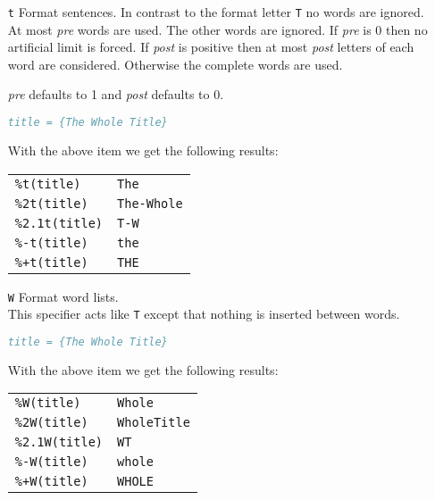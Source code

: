 \documentclass[11pt,a4paper]{scrbook}
\begin{document}
\begin{itemize}
  \item [\texttt{t}] Format sentences. In contrast to the
    format letter \texttt{T} no words are ignored.\\
    At most \textit{pre} words are used. The other words are ignored. If
    \textit{pre} is 0 then no artificial limit is forced. If \textit{post} is
    positive then at most \textit{post} letters of each word are considered.
    Otherwise the complete words are used.

    \textit{pre} defaults to 1 and \textit{post} defaults to 0.

    \begin{Example}
      \begin{lstlisting}[language=BibTeX]
  title = {The Whole Title}
      \end{lstlisting}\vspace{-2ex}
      With the above item we get the following results:

      \begin{tabular}{ll}
        \texttt{\%t(title)}	& \texttt{The}		\\
        \texttt{\%2t(title)}	& \texttt{The-Whole}	\\
        \texttt{\%2.1t(title)}	& \texttt{T-W}		\\
        \texttt{\%-t(title)}	& \texttt{the}		\\
        \texttt{\%+t(title)}	& \texttt{THE}
      \end{tabular}
    \end{Example}

  \item [\texttt{W}] Format word lists.\\
    This specifier acts like \texttt{T} except that nothing is inserted
    between words.

    \begin{Example}
      \begin{lstlisting}[language=BibTeX]
  title = {The Whole Title}
      \end{lstlisting}\vspace{-2ex}
      With the above item we get the following results:

      \begin{tabular}{ll}
        \texttt{\%W(title)}	& \texttt{Whole}		\\
        \texttt{\%2W(title)}	& \texttt{WholeTitle}		\\
        \texttt{\%2.1W(title)}	& \texttt{WT}			\\
        \texttt{\%-W(title)}	& \texttt{whole}		\\
        \texttt{\%+W(title)}	& \texttt{WHOLE}	
      \end{tabular}
    \end{Example}


\end{itemize}
\end{document}
